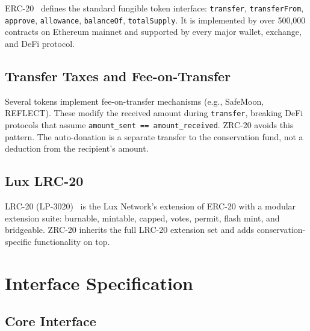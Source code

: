 \documentclass[11pt,letterpaper]{article}
\begin{document}
ERC-20~\cite{erc20} defines the standard fungible token interface: \texttt{transfer}, \texttt{transferFrom}, \texttt{approve}, \texttt{allowance}, \texttt{balanceOf}, \texttt{totalSupply}. It is implemented by over 500,000 contracts on Ethereum mainnet and supported by every major wallet, exchange, and DeFi protocol.

\subsection{Transfer Taxes and Fee-on-Transfer}

Several tokens implement fee-on-transfer mechanisms (e.g., SafeMoon, REFLECT). These modify the received amount during \texttt{transfer}, breaking DeFi protocols that assume \texttt{amount\_sent == amount\_received}. ZRC-20 avoids this pattern. The auto-donation is a separate transfer to the conservation fund, not a deduction from the recipient's amount.

\subsection{Lux LRC-20}

LRC-20 (LP-3020)~\cite{lrc20} is the Lux Network's extension of ERC-20 with a modular extension suite: burnable, mintable, capped, votes, permit, flash mint, and bridgeable. ZRC-20 inherits the full LRC-20 extension set and adds conservation-specific functionality on top.

\section{Interface Specification}
\label{sec:interface}

\subsection{Core Interface}
\end{document}
